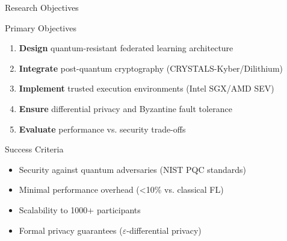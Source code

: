 \documentclass[aspectratio=169,11pt]{beamer}
\newcommand{\highlight}[1]{\textcolor{qflareblue}{\textbf{#1}}}
\begin{document}
\begin{frame}{Research Objectives}

\begin{block}{Primary Objectives}
\begin{enumerate}
    \item \highlight{Design} quantum-resistant federated learning architecture
    \item \highlight{Integrate} post-quantum cryptography (CRYSTALS-Kyber/Dilithium)
    \item \highlight{Implement} trusted execution environments (Intel SGX/AMD SEV)
    \item \highlight{Ensure} differential privacy and Byzantine fault tolerance
    \item \highlight{Evaluate} performance vs. security trade-offs
\end{enumerate}
\end{block}

\begin{block}{Success Criteria}
\begin{itemize}
    \item Security against quantum adversaries (NIST PQC standards)
    \item Minimal performance overhead (<10\% vs. classical FL)
    \item Scalability to 1000+ participants
    \item Formal privacy guarantees ($\varepsilon$-differential privacy)
\end{itemize}
\end{block}

\end{frame}

\end{document}
